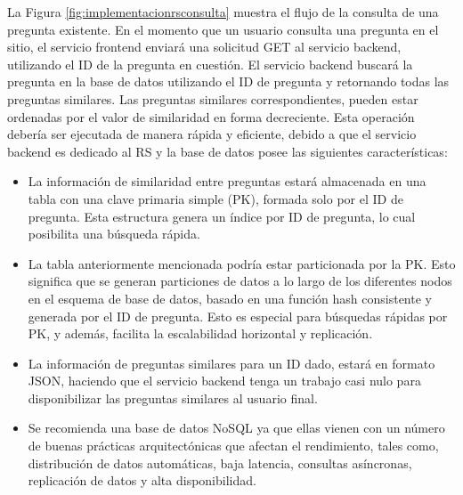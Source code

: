 La Figura \ref{fig:implementacionrsconsulta} muestra el flujo de la consulta de una pregunta existente. En el momento que un usuario consulta una pregunta en el sitio, el servicio frontend enviará una solicitud GET al servicio backend, utilizando el ID de la pregunta en cuestión. El servicio backend buscará la pregunta en la base de datos utilizando el ID de pregunta y retornando todas las preguntas similares. Las preguntas similares correspondientes, pueden estar ordenadas por el valor de similaridad en forma decreciente. Esta operación debería ser ejecutada de manera rápida y eficiente, debido a que el servicio backend es dedicado al RS y la base de datos posee las siguientes características:
\begin{itemize}
	\item La información de similaridad entre preguntas estará almacenada en una tabla con una clave primaria simple (PK), formada solo por el ID de pregunta. Esta estructura genera un índice por ID de pregunta, lo cual posibilita una búsqueda rápida.
	\item La tabla anteriormente mencionada podría estar particionada por la PK. Esto significa que se generan particiones de datos a lo largo de los diferentes nodos en el esquema de base de datos, basado en una función hash consistente y generada por el ID de pregunta. Esto es especial para búsquedas rápidas por PK, y además, facilita la escalabilidad horizontal y replicación.
	\item La información de preguntas similares para un ID dado, estará en formato JSON, haciendo que el servicio backend tenga un trabajo casi nulo para disponibilizar las preguntas similares al usuario final.
	\item Se recomienda una base de datos NoSQL ya que ellas vienen con un número de buenas prácticas arquitectónicas que afectan el rendimiento, tales como, distribución de datos automáticas, baja latencia, consultas asíncronas, replicación de datos y alta disponibilidad.
\end{itemize}

